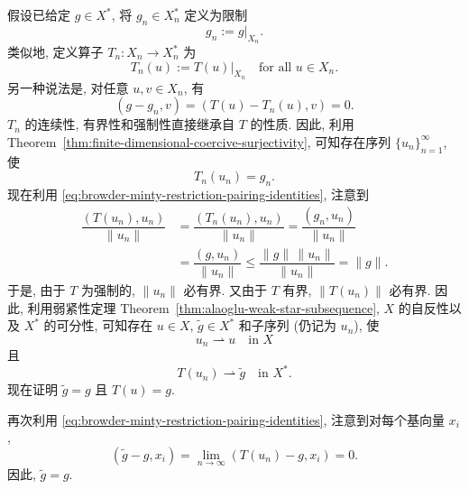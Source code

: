 \begin{Proof}
假设已给定 $g\in X^*$, 将 $g_n\in X_n^*$ 定义为限制
\begin{equation}\label{eq:browder-minty-restricted-right-hand-side}
g_n:=g|_{X_n}.
\end{equation}
类似地, 定义算子 $T_n:X_n\to X_n^*$ 为
\begin{equation}\label{eq:browder-minty-restricted-nonlinear-mapping}
T_n(u):=T(u)|_{X_n}\quad\text{for all }u\in X_n.
\end{equation}
另一种说法是, 对任意 $u,v\in X_n$, 有
\begin{equation}\label{eq:browder-minty-restriction-pairing-identities}
(g-g_n,v)=(T(u)-T_n(u),v)=0.
\end{equation}
$T_n$ 的连续性, 有界性和强制性直接继承自 $T$ 的性质. 因此, 利用 Theorem~\ref{thm:finite-dimensional-coercive-surjectivity}, 可知存在序列 $\{u_n\}_{n=1}^\infty$, 使
\begin{equation}\label{eq:browder-minty-galerkin-solution-sequence}
T_n(u_n)=g_n.
\end{equation}
现在利用 \eqref{eq:browder-minty-restriction-pairing-identities}, 注意到
\begin{equation}\label{eq:browder-minty-coercive-solution-norm-bound}
\begin{aligned}
\dfrac{(T(u_n),u_n)}{\|u_n\|}&=\dfrac{(T_n(u_n),u_n)}{\|u_n\|}=\dfrac{(g_n,u_n)}{\|u_n\|}\\
&=\dfrac{(g,u_n)}{\|u_n\|}\leq\dfrac{\|g\|\,\|u_n\|}{\|u_n\|}=\|g\|.
\end{aligned}
\end{equation}
于是, 由于 $T$ 为强制的, $\|u_n\|$ 必有界. 又由于 $T$ 有界, $\|T(u_n)\|$ 必有界. 因此, 利用弱紧性定理 Theorem~\ref{thm:alaoglu-weak-star-subsequence}, $X$ 的自反性以及 $X^*$ 的可分性, 可知存在 $u\in X$, $\widetilde g\in X^*$ 和子序列 (仍记为 $u_n$), 使
\begin{equation}\label{eq:browder-minty-galerkin-weak-solution-limit}
u_n\rightharpoonup u\quad\text{in }X
\end{equation}
且
\begin{equation}\label{eq:browder-minty-galerkin-weak-image-limit}
T(u_n)\rightharpoonup\widetilde g\quad\text{in }X^*.
\end{equation}
现在证明 $\widetilde g=g$ 且 $T(u)=g$.

再次利用 \eqref{eq:browder-minty-restriction-pairing-identities}, 注意到对每个基向量 $x_i$,
\begin{equation}\label{eq:browder-minty-identify-weak-image-limit}
(\widetilde g-g,x_i)=\lim_{n\to\infty}(T(u_n)-g,x_i)=0.
\end{equation}
因此, $\widetilde g=g$.


\end{Proof}
